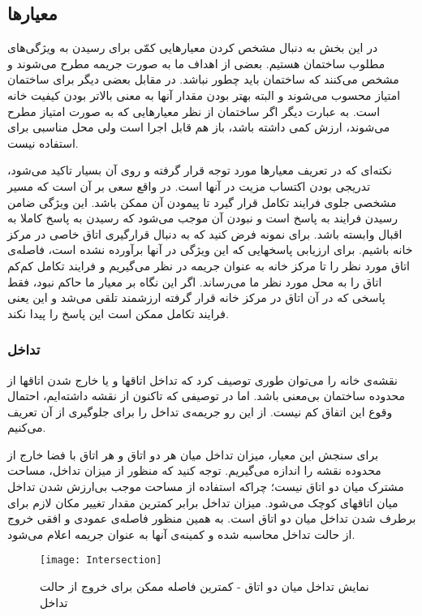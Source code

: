 \documentclass{report}
\begin{document}
\subsection{معیارها}
در این بخش به دنبال مشخص کردن معیارهایی کمّی برای رسیدن به ویژگی‌های مطلوب ساختمان هستیم. بعضی از اهداف ما به صورت جریمه مطرح می‌شوند و مشخص می‌کنند که ساختمان باید چطور نباشد. در مقابل بعضی دیگر برای ساختمان امتیاز محسوب می‌شوند و البته بهتر بودن مقدار آنها به معنی بالاتر بودن کیفیت خانه است. به عبارت دیگر اگر ساختمان از نظر معیارهایی که به صورت امتیاز مطرح می‌شوند، ارزش کمی داشته باشد، باز هم قابل اجرا است ولی محل مناسبی برای استفاده نیست.

نکته‌ای که در تعریف معیارها مورد توجه قرار گرفته و روی آن بسیار تاکید می‌شود، تدریجی بودن اکتساب مزیت در آنها است. در واقع سعی بر آن است که مسیر مشخصی جلوی فرایند تکامل قرار گیرد تا پیمودن آن ممکن باشد. این ویژگی ضامن رسیدن فرایند به پاسخ است و نبودن آن موجب می‌شود که رسیدن به پاسخ کاملا به اقبال وابسته باشد. برای نمونه فرض کنید که به دنبال قرارگیری اتاق خاصی در مرکز خانه باشیم. برای ارزیابی پاسخهایی که این ویژگی در آنها برآورده نشده است، فاصله‌ی اتاق مورد نظر را تا مرکز خانه به عنوان جریمه در نظر می‌گیریم و فرایند تکامل کم‌کم اتاق را به محل مورد نظر ما می‌رساند. اگر این نگاه بر معیار ما حاکم نبود، فقط پاسخی که در آن اتاق در مرکز خانه قرار گرفته ارزشمند تلقی می‌شد و این یعنی فرایند تکامل ممکن است این پاسخ را پیدا نکند.

\subsubsection{تداخل}
نقشه‌ی خانه را می‌توان طوری توصیف کرد که تداخل اتاقها و یا خارج شدن اتاقها از محدوده ساختمان بی‌معنی باشد. اما در توصیفی که تاکنون از نقشه داشته‌ایم، احتمال وقوع این اتفاق کم نیست. از این رو جریمه‌ی تداخل را برای جلوگیری از آن تعریف می‌کنیم.

برای سنجش این معیار، میزان تداخل میان هر دو اتاق و هر اتاق با فضا خارج از محدوده نقشه را اندازه می‌گیریم. توجه کنید که منظور از میزان تداخل، مساحت مشترک میان دو اتاق نیست؛ چراکه استفاده از مساحت موجب بی‌ارزش شدن تداخل میان اتاقهای کوچک می‌شود. میزان تداخل برابر کمترین مقدار تغییر مکان لازم برای برطرف شدن تداخل میان دو اتاق است. به همین منظور فاصله‌ی عمودی و افقی خروج از حالت تداخل محاسبه شده و کمینه‌ی آنها به عنوان جریمه اعلام می‌شود.

\begin{figure} \centerline{\texttt{[image: Intersection]}} \caption{\label{fIntersection}
نمایش تداخل میان دو اتاق - کمترین فاصله ممکن برای خروج از حالت تداخل
 } \end{figure}
\end{document}
